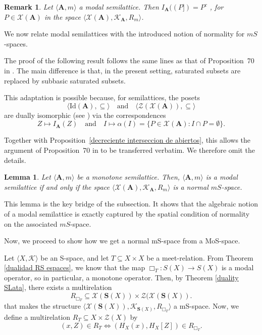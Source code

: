 \documentclass{article}
\newtheorem{remark}{\bf Remark}[section]
\newtheorem{lemma}{\bf Lemma}[section]
\begin{document}
\begin{remark}\label{ideal decreciente}
    Let $\langle \mathbf{A}, m \rangle$ a modal semilattice. Then $I_\mathbf{A}((P]) = P^c$ , for $P \in  \mathcal{X}(\mathbf{A})$ in the space $\langle \mathcal{X}(\mathbf{A}), \mathcal{K}_\mathbf{A}, R_m \rangle$.
\end{remark}

We now relate modal semilattices with the introduced notion of normality for $mS$-spaces.

\medskip

The proof of the following result follows the same lines as that of Proposition~70 in \cite{CM}. The main difference is that, in the present setting, saturated subsets are replaced by subbasic saturated subsets.

This adaptation is possible because, for semilattices, the posets
\[
\langle \mathrm{Id}(\mathbf{A}), \subseteq \rangle
\quad\text{and}\quad
\langle \mathcal{Z}(\mathcal{X}(\mathbf{A})), \subseteq \rangle
\]
are dually isomorphic (see \cite{P W}) via the correspondences
\[
Z \longmapsto I_{\mathbf{A}}(Z)
\quad \text{and} \quad
I \longmapsto \alpha(I)=\{P \in \mathcal{X}(\mathbf{A}) : I \cap P = \emptyset\}.
\]

Together with Proposition~\ref{decreciente interseccion de abiertos}, this allows the argument of Proposition~70 in \cite{CM} to be transferred verbatim. We therefore omit the details.


\begin{lemma}\label{dual normal}
Let $\langle \mathbf{A}, m \rangle$ be a monotone semilattice.  
Then, $\langle \mathbf{A}, m \rangle$ is a modal semilattice if and only if the space $\langle \mathcal{X}(\mathbf{A}), \mathcal{K}_\mathbf{A}, R_m \rangle$ is a normal $mS$-space.
\end{lemma}

This lemma is the key bridge of the subsection. It shows that the algebraic notion of a modal semilattice is exactly captured by the spatial condition of normality on the associated $mS$-space.   
\medskip

Now, we proceed to show how we get a normal mS-space from a MoS-space.
\medskip

Let $\langle X, \mathcal{K} \rangle$ be an S-space, and let $T \subseteq X \times X$ be a meet-relation. From Theorem \ref{dualidad RS espaces}, we know that the map $\Box_T: S(X) \rightarrow S(X)$ is a modal operator, so in particular, a monotone operator. Then, by Theorem \ref{duality SLata}, there exists a multirelation
\[
R_{\Box_T}\subseteq \mathcal{X}(\mathbf{S}(X)) \times \mathcal{Z}(\mathcal{X}(\mathbf{S}(X)).
\]
that makes the structure $\langle \mathcal{X}(\mathbf{S}(X)), \mathcal{K}_{\mathbf{S}(X)}, R_{\Box_T}\rangle$ a mS-space. Now, we define a multirelation $R_T \subseteq X \times \mathcal{Z}(X)$ by
\begin{equation}\label{T sombrero}
(x, Z) \in R_T \iff (H_X(x), H_X[Z]) \in R_{\Box_T}.
\end{equation}
\end{document}
